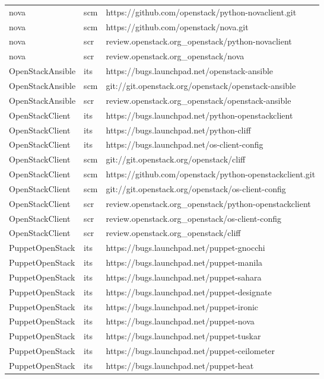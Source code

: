 \begin{center}
\begin{longtable}{|p{4cm}|p{1cm}|p{10cm}|}
nova&scm&https://github.com/openstack/python-novaclient.git\\ 
nova&scm&https://github.com/openstack/nova.git\\ 
nova&scr&review.openstack.org\_openstack/python-novaclient\\ 
nova&scr&review.openstack.org\_openstack/nova\\ 
OpenStackAnsible&its&https://bugs.launchpad.net/openstack-ansible\\ 
OpenStackAnsible&scm&git://git.openstack.org/openstack/openstack-ansible\\ 
OpenStackAnsible&scr&review.openstack.org\_openstack/openstack-ansible\\ 
OpenStackClient&its&https://bugs.launchpad.net/python-openstackclient\\ 
OpenStackClient&its&https://bugs.launchpad.net/python-cliff\\ 
OpenStackClient&its&https://bugs.launchpad.net/os-client-config\\ 
OpenStackClient&scm&git://git.openstack.org/openstack/cliff\\ 
OpenStackClient&scm&https://github.com/openstack/python-openstackclient.git\\ 
OpenStackClient&scm&git://git.openstack.org/openstack/os-client-config\\ 
OpenStackClient&scr&review.openstack.org\_openstack/python-openstackclient\\ 
OpenStackClient&scr&review.openstack.org\_openstack/os-client-config\\ 
OpenStackClient&scr&review.openstack.org\_openstack/cliff\\ 
PuppetOpenStack&its&https://bugs.launchpad.net/puppet-gnocchi\\ 
PuppetOpenStack&its&https://bugs.launchpad.net/puppet-manila\\ 
PuppetOpenStack&its&https://bugs.launchpad.net/puppet-sahara\\ 
PuppetOpenStack&its&https://bugs.launchpad.net/puppet-designate\\ 
PuppetOpenStack&its&https://bugs.launchpad.net/puppet-ironic\\ 
PuppetOpenStack&its&https://bugs.launchpad.net/puppet-nova\\ 
PuppetOpenStack&its&https://bugs.launchpad.net/puppet-tuskar\\ 
PuppetOpenStack&its&https://bugs.launchpad.net/puppet-ceilometer\\ 
PuppetOpenStack&its&https://bugs.launchpad.net/puppet-heat\\ 

\end{longtable}
\end{center}
